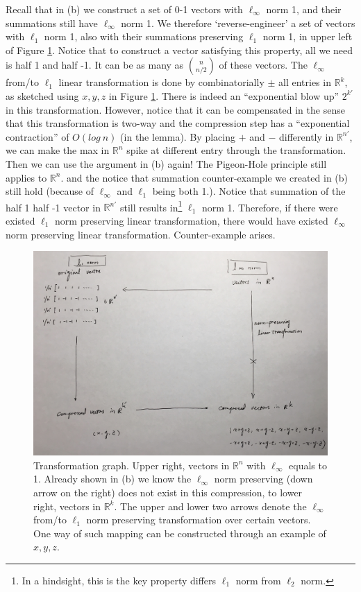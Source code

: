 \documentclass[12pt]{article}
\begin{document}
Recall that in (b) we construct a set of 0-1 vectors with $\ell_\infty$ norm 1, and their summations still have $\ell_\infty$ norm 1. We therefore `reverse-engineer' a set of vectors with $\ell_1$ norm 1, also with their summations preserving $\ell_1$ norm 1, in upper left of Figure \ref{fig:6-3}. Notice that to construct a vector satisfying this property, all we need is half 1 and half -1. It can be as many as {$n \choose n/2$} of these vectors. The $\ell_\infty$ from/to $\ell_1$ linear transformation is done by combinatorially $\pm$ all entries in $\mathbb{R}^k$, as sketched using $x, y, z$ in Figure \ref{fig:6-3}. There is indeed an ``exponential blow up'' $2^{k'}$ in this transformation. However, notice that it can be compensated in the sense that this transformation is two-way and the compression step has a ``exponential contraction'' of $O(log\:n)$ (in the lemma). By placing $+$ and $-$ differently in $\mathbb{R}^{n'}$, we can make the max in $\mathbb{R}^n$ spike at different entry through the transformation. Then we can use the argument in (b) again! The Pigeon-Hole principle still applies to $\mathbb{R}^n$. and the notice that summation counter-example we created in (b) still hold (because of $\ell_\infty$ and $\ell_1$ being both 1.). Notice that summation of the half 1 half -1 vector in $\mathbb{R}^{n'}$ still results in\footnote{In a hindsight, this is the key property differs $\ell_1$ norm from $\ell_2$ norm.} $\ell_1$ norm 1. Therefore, if there were existed $\ell_1$ norm preserving linear transformation, there would have existed  $\ell_\infty$ norm preserving linear transformation. Counter-example arises. 
\begin{figure}
	\centering
	\includegraphics[width=1\textwidth]{6-c.jpg}
	\caption{Transformation graph. Upper right, vectors in $\mathbb{R}^n$ with $\ell_\infty$ equals to 1. Already shown in (b) we know the $\ell_\infty$ norm preserving (down arrow on the right) does not exist in this compression, to lower right, vectors in $\mathbb{R}^k$. The upper and lower two arrows denote the $\ell_\infty$ from/to $\ell_1$ norm preserving transformation over certain vectors. One way of such mapping can be constructed through an example of $x, y, z$. } \label{fig:6-3}
\end{figure}
\end{document}
